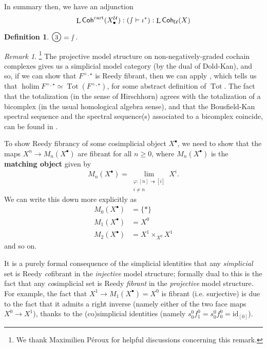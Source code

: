 \documentclass[11pt,fleqn]{article}
\theoremstyle{plain}
\theoremstyle{definition}
\newtheorem{definition}[theorem]{Definition}
\theoremstyle{remark}
\newtheorem{remark}[theorem]{Remark}
\numberwithin{equation}{theorem}
\newcommand{\cover}{\mathcal{U}}
\newcommand{\anotherbullet}{\star}
\newcommand{\yetanotherbullet}{\diamond}
\newcommand{\id}{\mathrm{id}}
\newcommand{\gcohUX}{\mathsf{Coh}_{\cover}(X)}
\newcommand{\cartcohX}{\mathsf{Coh}^\mathrm{cart}(X_\bullet^\cover)}
\newcommand{\define}[1]{\textbf{#1}}
\newcommand{\numberincircle}[1]{\text{\normalfont\Large\textcircled{\small #1}}}
\DeclareMathOperator{\Tot}{Tot}
\DeclareMathOperator{\LL}{L}
\DeclareMathOperator{\holim}{holim}
\begin{document}
        \medskip

        In summary then, we have an adjunction
        \begin{equation}
        \label{equation:adjunction-of-localisations}
            \LL{\cartcohX}:(\smallint\vdash\iota^*):\LL{\gcohUX}
        \end{equation}

        \begin{definition}\label{definition:defining-numberincircle3}
            $\numberincircle{3}=\smallint$.
        \end{definition}

        \begin{remark}\label{remark:reedy-totalisation-etc}\footnote{We thank Maximilien Péroux for helpful discussions concerning this remark.}
            The projective model structure on non-negatively-graded cochain complexes gives us a simplicial model category (by the dual of Dold-Kan), and so, if we can show that $F^{\yetanotherbullet,\anotherbullet}$ is Reedy fibrant, then we can apply \cite[Theorem~19.8.7]{Hirschhorn2003}, which tells us that $\holim F^{\yetanotherbullet,\anotherbullet}\simeq\Tot(F^{\yetanotherbullet,\anotherbullet})$, for some abstract definition of $\Tot$.
            The fact that the totalization (in the sense of Hirschhorn) agrees with the totalization of a bicomplex (in the usual homological algebra sense), and that the Bousfield-Kan spectral sequence and the spectral sequence(s) associated to a bicomplex coincide, can be found in \cite[{}III.1.1.13]{Fresse2017}.

            To show Reedy fibrancy of some cosimplicial object $X^\bullet$, we need to show that the maps $X^n\to M_n(X^\bullet)$ are fibrant for all $n\geqslant0$, where $M_n(X^\bullet)$ is the \define{matching object} given by
            \[
                M_n(X^\bullet)
                =
                \lim_{\substack{\varphi\colon[n]\twoheadrightarrow[i] \\ i\neq n}} X^i.
            \]
            We can write this down more explicitly as
            \begin{align*}
                M_0(X^\bullet)
                &=
                \{*\}
            \\  M_1(X^\bullet)
                &=
                X^0
            \\  M_2(X^\bullet)
                &=
                X^1 \times_{X^0} X^1
            \end{align*}
            and so on.

            It is a purely formal consequence of the simplicial identities that any \emph{simplicial} set is Reedy \emph{co}fibrant in the \emph{injective} model structure; formally dual to this is the fact that any \emph{co}simplicial set is Reedy \emph{fibrant} in the \emph{projective} model structure.
            For example, the fact that $X^1\to M_1(X^\bullet)=X^0$ is fibrant (i.e. surjective) is due to the fact that it admits a right inverse (namely either of the two face maps $X^0\to X^1$), thanks to the (co)simplicial identities (namely $s_0^0 f_1^0 = s_0^0 f_0^0 = \id_{[0]}$).
        \end{remark}
\end{document}
